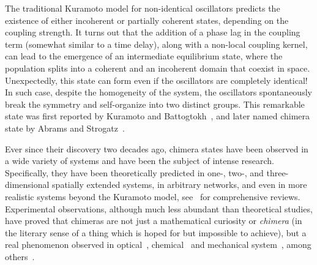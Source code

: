 The traditional Kuramoto model for non-identical oscillators predicts 
the existence of either incoherent or partially coherent states, depending on the coupling strength.
It turns out that the addition of a phase lag
in the coupling term (somewhat similar to a time delay), along with a non-local coupling
kernel, can lead to the emergence of an intermediate equilibrium state, where the population splits 
into a coherent and an incoherent domain that coexist in space. Unexpectedly, this state can form
even if the oscillators are completely identical! In such case, despite the homogeneity of the system,
the oscillators spontaneously break the symmetry and self-organize into two distinct groups.
This remarkable state was first reported by Kuramoto and Battogtokh~\cite{kuramoto2002coexistence},
and later named chimera state by Abrams and Strogatz~\cite{abrams2004chimera}. 

Ever since their discovery two decades ago, chimera states have been observed in a wide
variety of systems and have been the subject of intense research. Specifically, they have
been theoretically predicted in one-, two-, and three-dimensional spatially extended systems,
in arbitrary networks, and even in more realistic systems beyond the Kuramoto model,
see~\cite{panaggio2015chimera,scholl2016synchronization,omelchenko2018mathematics,
haugland2021changing,majhi2019chimera,parastesh2021chimeras} for comprehensive reviews. 
Experimental observations, although much less abundant than theoretical studies, have proved
that chimeras are not just a mathematical curiosity or {\em chimera} (in the literary sense of
a thing which is hoped for but impossible to achieve), but a real phenomenon observed in
optical~\cite{hagerstrom2012experimental}, chemical~\cite{tinsley2012chimera, nkomo2013chimera,totz2018spiral} and 
mechanical system~\cite{martens2013chimera}, among others~\cite{schmidt2014coexistence, viktorov2014coherence, wickramasinghe2013spatially}.
 
